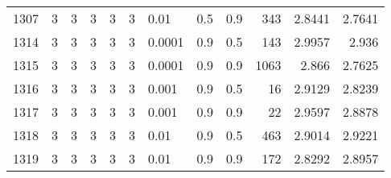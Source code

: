 \begin{longtable}{lrrrrrlrrrrr}
1307 &       3 & 3 & 3 & 3 & 3 &                        0.01 &  0.5 &    0.9 &     343 &                 2.8441 &                 2.7641 \\
1314 &       3 & 3 & 3 & 3 & 3 &                      0.0001 &  0.9 &    0.5 &     143 &                 2.9957 &                  2.936 \\
1315 &       3 & 3 & 3 & 3 & 3 &                      0.0001 &  0.9 &    0.9 &    1063 &                  2.866 &                 2.7625 \\
1316 &       3 & 3 & 3 & 3 & 3 &                       0.001 &  0.9 &    0.5 &      16 &                 2.9129 &                 2.8239 \\
1317 &       3 & 3 & 3 & 3 & 3 &                       0.001 &  0.9 &    0.9 &      22 &                 2.9597 &                 2.8878 \\
1318 &       3 & 3 & 3 & 3 & 3 &                        0.01 &  0.9 &    0.5 &     463 &                 2.9014 &                 2.9221 \\
1319 &       3 & 3 & 3 & 3 & 3 &                        0.01 &  0.9 &    0.9 &     172 &                 2.8292 &                 2.8957 \\
\end{longtable}
